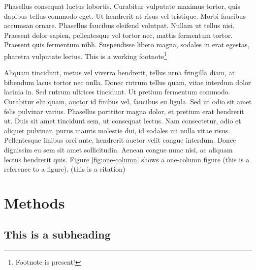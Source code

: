 \documentclass[paper=a4,fontsize=11pt,twocolumn]{article}
\begin{document}
Phasellus consequat luctus lobortis. Curabitur vulputate maximus tortor, quis dapibus tellus commodo eget. Ut hendrerit at risus vel tristique. Morbi faucibus accumsan ornare. Phasellus faucibus eleifend volutpat. Nullam ut tellus nisi. Praesent dolor sapien, pellentesque vel tortor nec, mattis fermentum tortor. Praesent quis fermentum nibh. Suspendisse libero magna, sodales in erat egestas, pharetra vulputate lectus. This is a working footnote\footnote{Footnote is present!}

Aliquam tincidunt, metus vel viverra hendrerit, tellus urna fringilla diam, at bibendum lacus tortor nec nulla. Donec rutrum tellus quam, vitae interdum dolor lacinia in. Sed rutrum ultrices tincidunt. Ut pretium fermentum commodo. Curabitur elit quam, auctor id finibus vel, faucibus eu ligula. Sed ut odio sit amet felis pulvinar varius. Phasellus porttitor magna dolor, et pretium erat hendrerit ut. Duis sit amet tincidunt sem, ut consequat lectus. Nam consectetur, odio et aliquet pulvinar, purus mauris molestie dui, id sodales mi nulla vitae risus. Pellentesque finibus orci ante, hendrerit auctor velit congue interdum. Donec dignissim eu sem sit amet sollicitudin. Aenean congue nunc nisi, ac aliquam lectus hendrerit quis.
Figure  \ref{fig:one-column} shows a one-column figure (this is a reference to a figure).
\cite{Buss2008} (this is a citation)

\section{Methods}
\label{methods}
\subsection{This is a subheading}
\end{document}
